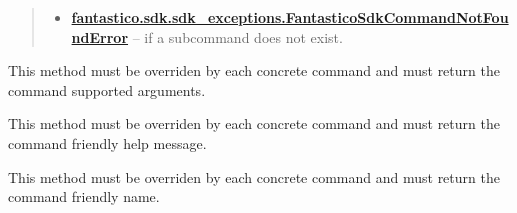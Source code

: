 \documentclass[letterpaper,10pt,english]{sphinxmanual}
\begin{document}
\begin{fulllineitems}
\begin{fulllineitems}
\begin{quote}
\begin{description}
\begin{itemize}
\item {} 
{\hyperref[features/sdk:fantastico.sdk.sdk_exceptions.FantasticoSdkCommandNotFoundError]{\textbf{fantastico.sdk.sdk\_exceptions.FantasticoSdkCommandNotFoundError}}} -- if a subcommand does not exist.

\end{itemize}

\end{description}\end{quote}

\end{fulllineitems}


\begin{fulllineitems}
\label{features/sdk:fantastico.sdk.sdk_core.SdkCommand.get_arguments}
This method must be overriden by each concrete command and must return the command supported arguments.

\end{fulllineitems}


\begin{fulllineitems}
\label{features/sdk:fantastico.sdk.sdk_core.SdkCommand.get_help}
This method must be overriden by each concrete command and must return the command friendly help message.

\end{fulllineitems}


\begin{fulllineitems}
\label{features/sdk:fantastico.sdk.sdk_core.SdkCommand.get_name}
This method must be overriden by each concrete command and must return the command friendly name.

\end{fulllineitems}


\end{fulllineitems}

\end{document}
